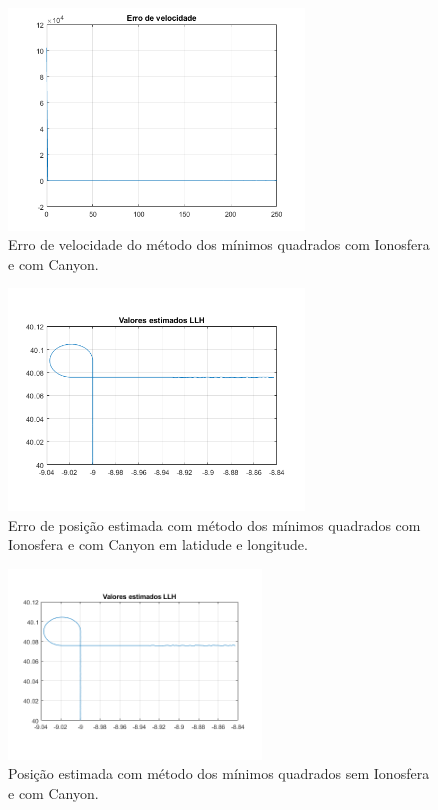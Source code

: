 \documentclass[palatino]{ist-report}
\begin{document}
\begin{figure}[ht]
	\centering
	\includegraphics[width=0.7\textwidth,trim={0 5mm 0 0}, clip]{graphics/erro_velocidade11.png}
	\caption{Erro de velocidade do método dos mínimos quadrados com Ionosfera e com Canyon.}
	\label{vls11}
\end{figure}

\begin{figure}[ht]
	\centering
	\includegraphics[width = 0.7\textwidth, trim = {7mm 17mm 10mm 10mm}, clip]{graphics/plot_posicao_estimada_LLH11.png}
	\caption{Erro de posição estimada com método dos mínimos quadrados com Ionosfera e com Canyon em latidude e longitude.}
	\label{LLH11}
\end{figure}



\begin{figure}[ht]
	\centering
	\includegraphics[width=0.6\textwidth]{graphics/plot_posicao_estimada_LLH12.png}
	\caption{Posição estimada com método dos mínimos quadrados sem Ionosfera e com Canyon.}
	\label{posicao12}
\end{figure}
\end{document}
